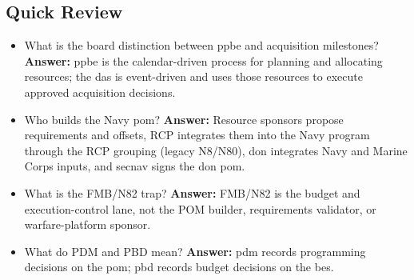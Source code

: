 \documentclass[../main.tex]{subfiles}
\begin{document}
\subsection{Quick Review}
\begin{itemize}
  \item What is the board distinction between \ac{ppbe} and acquisition milestones? \textbf{Answer:} \ac{ppbe} is the
  calendar-driven process for planning and allocating resources; the \ac{das} is event-driven and uses those resources
  to execute approved acquisition decisions.
  \item Who builds the Navy \ac{pom}? \textbf{Answer:} Resource sponsors propose requirements and offsets, RCP
  integrates them into the Navy program through the RCP grouping (legacy N8/N80), \ac{don} integrates Navy and Marine Corps inputs, and \ac{secnav} signs the
  \ac{don} \ac{pom}.
  \item What is the FMB/N82 trap? \textbf{Answer:} FMB/N82 is the budget and execution-control lane, not the POM builder,
  requirements validator, or warfare-platform sponsor.
  \item What do PDM and PBD mean? \textbf{Answer:} \ac{pdm} records programming decisions on the \ac{pom}; \ac{pbd}
  records budget decisions on the \ac{bes}.
\end{itemize}

\end{document}
